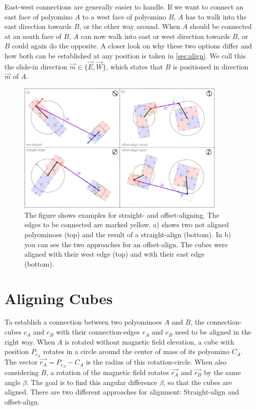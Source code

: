 East-west connections are generally easier to handle.
If we want to connect an east face of polyomino $A$ to a west face of polyomino $B$, $A$ has to walk into the east direction towards $B$, or the other way around.
When $A$ should be connected at an south face of $B$, $A$ can now walk into east or west direction towards $B$, or $B$ could again do the opposite.
A closer look on why these two options differ and how both can be established at any position is taken in \autoref{sec:align}.
We call this the slide-in direction $\vec{m} \in \{\vec{E}, \vec{W}\}$, which states that $B$ is positioned in direction $\vec{m}$ of $A$.

\begin{figure}
	\centering
	\includegraphics[width=0.90\textwidth]{figures/aligning.pdf}
	\caption[Illustration of straight- and offset-aligning]{The figure shows examples for straight- and offset-aligning. The edges to be connected are marked yellow. a) shows two not aligned polyominoes (top) and the result of a straight-align (bottom). In b) you can see the two approaches for an offset-align. The cubes were aligned with their west edge (top) and with their east edge (bottom).}
	\label{fig:aligning}
\end{figure}

\section{Aligning Cubes}
\label{sec:align}

To establish a connection between two polyominoes $A$ and $B$, the connection-cubes $c_A$ and $c_B$ with their connection-edges $e_A$ and $e_B$ need to be aligned in the right way.
When $A$ is rotated without magnetic field elevation, a cube with position $P_{c_A}$ rotates in a circle around the center of mass of its polyomino $C_A$.
The vector $\vec{r_A} = P_{c_A} - C_A$ is the radius of this rotation-circle.
When also considering $B$, a rotation of the magnetic field rotates $\vec{r_A}$ and $\vec{r_B}$ by the same angle $\beta$.
The goal is to find this angular difference $\beta$, so that the cubes are aligned.
There are two different approaches for alignment: Straight-align and offset-align.

